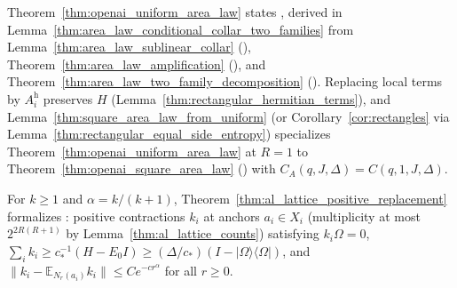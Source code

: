 \begin{remark}
    \label{rem:peps_companion_area_law}
    Theorem~\ref{thm:openai_uniform_area_law} states
    \cite[Theorem~1.1]{OpenAI2026AreaLaw}, derived in
    Lemma~\ref{thm:area_law_conditional_collar_two_families} from
    Lemma~\ref{thm:area_law_sublinear_collar}
    (\cite[Proposition~9.6]{OpenAI2026AreaLaw}),
    Theorem~\ref{thm:area_law_amplification}
    (\cite[Proposition~10.2]{OpenAI2026AreaLaw}), and
    Theorem~\ref{thm:area_law_two_family_decomposition}
    (\cite[Proposition~11.2]{OpenAI2026AreaLaw}).
    Replacing local terms by $A_i^{\mathrm h}$ preserves $H$
    (Lemma~\ref{thm:rectangular_hermitian_terms}), and
    Lemma~\ref{thm:square_area_law_from_uniform} (or
    Corollary~\ref{cor:rectangles} via
    Lemma~\ref{thm:rectangular_equal_side_entropy}) specializes
    Theorem~\ref{thm:openai_uniform_area_law} at $R=1$ to
    Theorem~\ref{thm:openai_square_area_law}
    (\cite[Proposition~2.1]{OpenAI2026PolynomialPEPS}) with
    $C_A(q,J,\Delta)=C(q,1,J,\Delta)$.
\end{remark}

\begin{remark}
    \label{rem:peps_companion_positive_replacement}
    For $k\ge1$ and $\alpha=k/(k+1)$,
    Theorem~\ref{thm:al_lattice_positive_replacement} formalizes
    \cite[Proposition~4.3]{OpenAI2026AreaLaw}: positive contractions $k_i$ at
    anchors $a_i\in X_i$ (multiplicity at most $2^{2R(R+1)}$ by
    Lemma~\ref{thm:al_lattice_counts}) satisfying $k_i\Omega=0$,
    $\sum_ik_i\ge c_*^{-1}(H-E_0I)\ge(\Delta/c_*)(I-|\Omega\rangle\langle\Omega|)$,
    and $\|k_i-\mathbb E_{N_r(a_i)}k_i\|\le Ce^{-cr^\alpha}$ for all $r\ge0$.
\end{remark}

